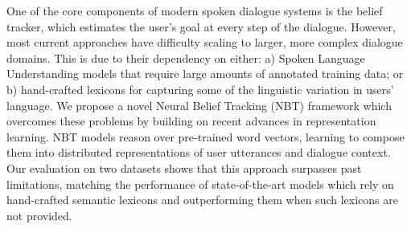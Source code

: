 One of the core components of modern spoken dialogue systems is the belief tracker, which estimates the user's goal at every step of the dialogue. However, most current approaches have difficulty scaling to larger, more complex dialogue domains. This is due to their dependency on either: a) Spoken Language Understanding models that require large amounts of annotated training data; or b) hand-crafted lexicons for capturing some of the linguistic variation in users' language. We propose a novel Neural Belief Tracking (NBT) framework which overcomes these problems by building on recent advances in representation learning. NBT models reason over pre-trained word vectors, learning to compose them into distributed representations of user utterances and dialogue context. Our evaluation on two datasets shows that this approach surpasses past limitations, matching the performance of state-of-the-art models which rely on hand-crafted semantic lexicons and outperforming them when such lexicons are not provided.
